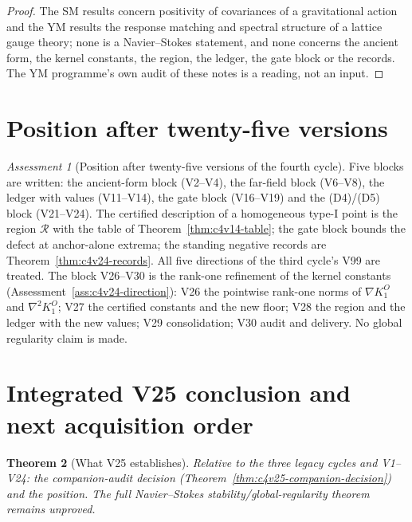 \documentclass[11pt]{article}
\theoremstyle{plain}
\newtheorem{theorem}{Theorem}[section]
\theoremstyle{definition}
\theoremstyle{remark}
\newtheorem{assessment}[theorem]{Assessment}
\begin{document}
\begin{proof}
The SM results concern positivity of covariances of a gravitational
action and the YM results the response matching and spectral
structure of a lattice gauge theory; none is a Navier--Stokes
statement, and none concerns the ancient form, the kernel constants,
the region, the ledger, the gate block or the records.  The YM
programme's own audit of these notes is a reading, not an input.
\end{proof}

\section{Position after twenty-five versions}
\label{sec:c4v25-position}

\begin{assessment}[Position after twenty-five versions of the fourth cycle]
\label{ass:c4v25-position-twentyfive}
Five blocks are written: the ancient-form block (V2--V4), the
far-field block (V6--V8), the ledger with values (V11--V14), the gate
block (V16--V19) and the (D4)/(D5) block (V21--V24).  The certified
description of a homogeneous type-I point is the region \(\mathcal R\) with the
table of Theorem~\ref{thm:c4v14-table}; the gate block bounds the
defect at anchor-alone extrema; the standing negative records are
Theorem~\ref{thm:c4v24-records}.  All five directions of the third
cycle's V99 are treated.  The block V26--V30 is the rank-one
refinement of the kernel constants (Assessment~\ref{ass:c4v24-direction}):
V26 the pointwise rank-one norms of \(\nabla K^O_1\) and \(\nabla^2K^O_1\); V27 the
certified constants and the new floor; V28 the region and the
ledger with the new values; V29 consolidation; V30 audit and
delivery.  No global regularity claim is made.
\end{assessment}

\section{Integrated V25 conclusion and next acquisition order}
\label{sec:c4v25-conclusion}

\begin{theorem}[What V25 establishes]
\label{thm:c4v25-conclusion}
Relative to the three legacy cycles and V1--V24: the companion-audit
decision (Theorem~\ref{thm:c4v25-companion-decision}) and the position.
The full Navier--Stokes stability/global-regularity theorem remains
unproved.
\end{theorem}
\end{document}

